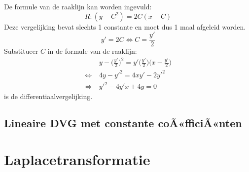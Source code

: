 {\begin{enumerate}
De formule van de raaklijn kan worden ingevuld:
$$R: (y - C^2) = 2C(x - C)$$
Deze vergelijking bevat slechts 1 constante en moet dus 1 maal afgeleid worden.
$$y' = 2C \Leftrightarrow C = \frac{y'}{2}$$
Substitueer $C$ in de formule van de raaklijn:
\begin{equation*}
\begin{split}
    & y - \bigg(\frac{y'}{2}\bigg)^2 = y'\bigg(\frac{y'}{2}\bigg)\bigg(x - \frac{y'}{2}\bigg) \\
    \Leftrightarrow \; & 4y - y'^2 = 4xy' - 2y'^2 \\
    \Leftrightarrow \; & y'^2 - 4y'x + 4y = 0
\end{split}
\end{equation*}
is de differentiaalvergelijking.
\end{enumerate}
}
\section{Lineaire DVG met constante coÃ«fficiÃ«nten}

\chapter{Laplacetransformatie}

